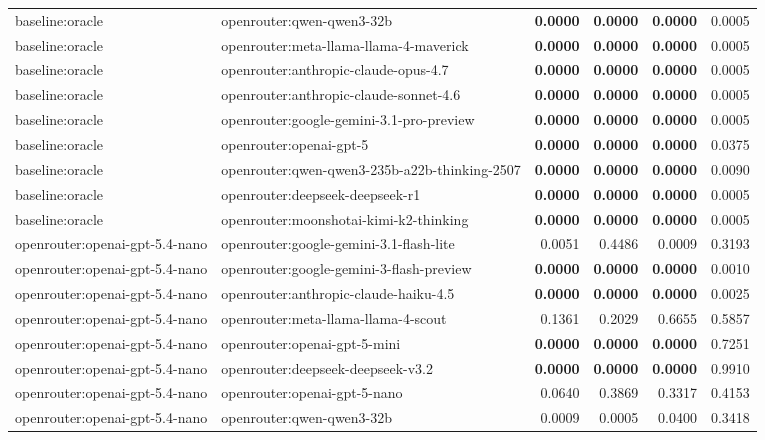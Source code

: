 \begin{table}[t]
\begin{tabular}{llrrrr}
baseline:oracle & openrouter:qwen-qwen3-32b & \textbf{0.0000} & \textbf{0.0000} & \textbf{0.0000} & 0.0005 \\
baseline:oracle & openrouter:meta-llama-llama-4-maverick & \textbf{0.0000} & \textbf{0.0000} & \textbf{0.0000} & 0.0005 \\
baseline:oracle & openrouter:anthropic-claude-opus-4.7 & \textbf{0.0000} & \textbf{0.0000} & \textbf{0.0000} & 0.0005 \\
baseline:oracle & openrouter:anthropic-claude-sonnet-4.6 & \textbf{0.0000} & \textbf{0.0000} & \textbf{0.0000} & 0.0005 \\
baseline:oracle & openrouter:google-gemini-3.1-pro-preview & \textbf{0.0000} & \textbf{0.0000} & \textbf{0.0000} & 0.0005 \\
baseline:oracle & openrouter:openai-gpt-5 & \textbf{0.0000} & \textbf{0.0000} & \textbf{0.0000} & 0.0375 \\
baseline:oracle & openrouter:qwen-qwen3-235b-a22b-thinking-2507 & \textbf{0.0000} & \textbf{0.0000} & \textbf{0.0000} & 0.0090 \\
baseline:oracle & openrouter:deepseek-deepseek-r1 & \textbf{0.0000} & \textbf{0.0000} & \textbf{0.0000} & 0.0005 \\
baseline:oracle & openrouter:moonshotai-kimi-k2-thinking & \textbf{0.0000} & \textbf{0.0000} & \textbf{0.0000} & 0.0005 \\
openrouter:openai-gpt-5.4-nano & openrouter:google-gemini-3.1-flash-lite & 0.0051 & 0.4486 & 0.0009 & 0.3193 \\
openrouter:openai-gpt-5.4-nano & openrouter:google-gemini-3-flash-preview & \textbf{0.0000} & \textbf{0.0000} & \textbf{0.0000} & 0.0010 \\
openrouter:openai-gpt-5.4-nano & openrouter:anthropic-claude-haiku-4.5 & \textbf{0.0000} & \textbf{0.0000} & \textbf{0.0000} & 0.0025 \\
openrouter:openai-gpt-5.4-nano & openrouter:meta-llama-llama-4-scout & 0.1361 & 0.2029 & 0.6655 & 0.5857 \\
openrouter:openai-gpt-5.4-nano & openrouter:openai-gpt-5-mini & \textbf{0.0000} & \textbf{0.0000} & \textbf{0.0000} & 0.7251 \\
openrouter:openai-gpt-5.4-nano & openrouter:deepseek-deepseek-v3.2 & \textbf{0.0000} & \textbf{0.0000} & \textbf{0.0000} & 0.9910 \\
openrouter:openai-gpt-5.4-nano & openrouter:openai-gpt-5-nano & 0.0640 & 0.3869 & 0.3317 & 0.4153 \\
openrouter:openai-gpt-5.4-nano & openrouter:qwen-qwen3-32b & 0.0009 & 0.0005 & 0.0400 & 0.3418 \\

\end{tabular}
\end{table}
